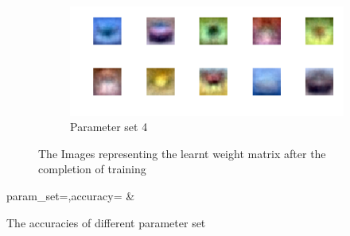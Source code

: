 \documentclass[12pt]{article}
\begin{document}
\begin{figure}
\begin{subfigure}[b]{0.475\textwidth}
        \centering
        \includegraphics[width=\textwidth]{wgt_case4.png}
        \caption[]%
        {{\small Parameter set 4}}
    \end{subfigure}
    \caption[]
    {\small The Images representing the learnt weight matrix after the completion of training}
    \label{fig:wgt_mat}
\end{figure}

\begin{table}
    \centering
    {param_set=\paramset,accuracy=\accuracy}
    {\paramset & \accuracy}
    \caption{The accuracies of different parameter set}
    \label{table:accuracy}
\end{table}
\end{document}
